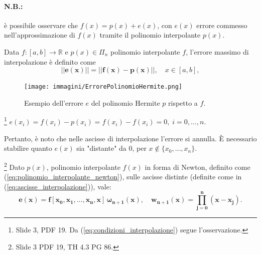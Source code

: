 \paragraph{N.B.:} è possibile osservare che $f(x)=p(x)+e(x)$, con $e(x)$ errore commesso nell'approssimazione di $f(x)$ tramite il polinomio interpolante $p(x)$.

\begin{definition}
	Data $f:[a,b]\rightarrow\mathbb{R}$ e $p(x)\in\Pi_n$ polinomio interpolante $f$, l'errore massimo di interpolazione è definito come
	\begin{equation}\label{eq:errore_massimo_interpolazione}
		\boldsymbol{||e(x)||=||f(x)-p(x)||},\quad x\in [a,b],
	\end{equation}
\end{definition}

\begin{figure}
    \centering
    \texttt{[image: immagini/ErrorePolinomioHermite.png]}
    \caption{Esempio dell'errore $e$ del polinomio Hermite $p$ rispetto a $f$.}
    \label{fig:errore_polinomio_hermite}
\end{figure}
 
\begin{remark}
    \footnote{Slide 3, PDF 19. Da (\ref{eq:condizioni_interpolazione}) segue l'osservazione.} $e(x_i)=f(x_i)-p(x_i)=f(x_i)-f(x_i)=0,\; i=0,\hdots,n.$
\end{remark}

Pertanto, è noto che nelle ascisse di interpolazione l'errore si annulla. È necessario stabilire quanto $e(x)$ sia "distante" da 0, per $x\notin \{x_0,\hdots, x_n\}.$

\begin{theorem}\label{th:errore_interpolazione_forma_newton}\footnote{Slide 3 PDF 19, TH 4.3 PG 86.} 
	Dato $p(x)$, polinomio interpolante $f(x)$ in forma di Newton, definito come (\ref{eq:polinomio_interpolante_newton}), sulle ascisse distinte (definite come in (\ref{eq:ascisse_interpolazione})), vale:
    \begin{equation}\label{eq:errore_interpolazione_forma_newton}
        \boldsymbol{e(x)=f[x_0,x_1,\hdots,x_n,x]\,\omega_{n+1}(x),\quad w_{n+1}(x)=\prod_{j=0}^{n}(x-x_j)}.
    \end{equation}
\end{theorem}

